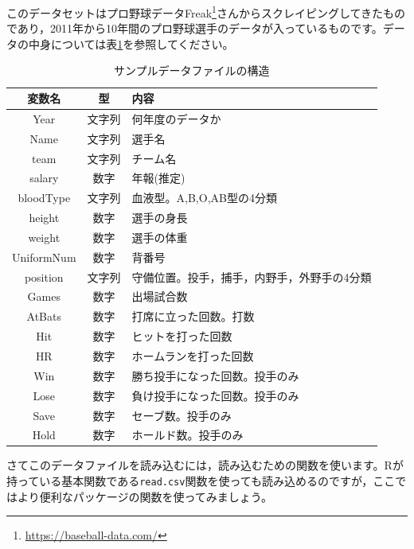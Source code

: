 \documentclass{ltjsbook}
\begin{document}
このデータセットはプロ野球データFreak\footnote{\url{https://baseball-data.com/}}さんからスクレイピングしてきたものであり，2011年から10年間のプロ野球選手のデータが入っているものです。データの中身については表\ref{BaseballDecade}を参照してください。
\begin{table}[b]
	\begin{center}
		\caption{サンプルデータファイルの構造}
		\begin{tabular}{ccl}
			変数名        & 型   & 内容                     \\\hline
			Year       & 文字列 & 何年度のデータか               \\
			Name       & 文字列 & 選手名                    \\
			team       & 文字列 & チーム名                   \\
			salary     & 数字  & 年報(推定)                 \\
			bloodType  & 文字列 & 血液型。A,B,O,AB型の4分類      \\
			height     & 数字  & 選手の身長                  \\
			weight     & 数字  & 選手の体重                  \\
			UniformNum & 数字  & 背番号                    \\
			position   & 文字列 & 守備位置。投手，捕手，内野手，外野手の4分類 \\
			Games      & 数字  & 出場試合数                  \\
			AtBats     & 数字  & 打席に立った回数。打数            \\
			Hit        & 数字  & ヒットを打った回数              \\
			HR         & 数字  & ホームランを打った回数            \\
			Win        & 数字  & 勝ち投手になった回数。投手のみ        \\
			Lose       & 数字  & 負け投手になった回数。投手のみ        \\
			Save       & 数字  & セーブ数。投手のみ              \\
			Hold       & 数字  & ホールド数。投手のみ             \\\hline
		\end{tabular}
		\label{BaseballDecade}
	\end{center}
\end{table}

さてこのデータファイルを読み込むには，読み込むための関数を使います。Rが持っている基本関数である\texttt{read.csv}関数を使っても読み込めるのですが，ここではより便利なパッケージの関数を使ってみましょう。
\end{document}
